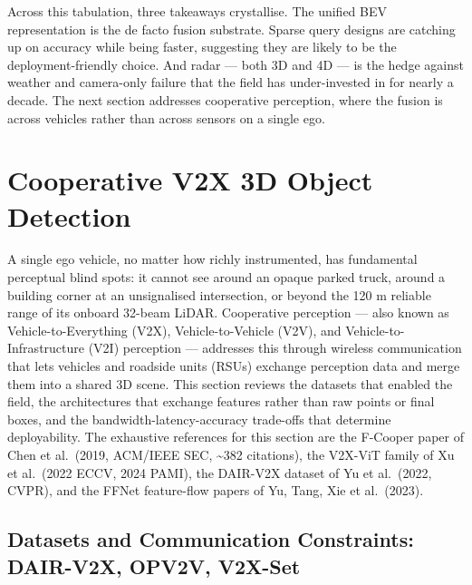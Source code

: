 \documentclass{article}
\begin{document}
Across this tabulation, three takeaways crystallise. The unified BEV representation is the de facto fusion substrate. Sparse query designs are catching up on accuracy while being faster, suggesting they are likely to be the deployment-friendly choice. And radar --- both 3D and 4D --- is the hedge against weather and camera-only failure that the field has under-invested in for nearly a decade. The next section addresses cooperative perception, where the fusion is across vehicles rather than across sensors on a single ego.
\section{Cooperative V2X 3D Object Detection}\label{sec:cooperative-v2x-3d-object-detection}
A single ego vehicle, no matter how richly instrumented, has fundamental perceptual blind spots: it cannot see around an opaque parked truck, around a building corner at an unsignalised intersection, or beyond the 120 m reliable range of its onboard 32-beam LiDAR. Cooperative perception --- also known as Vehicle-to-Everything (V2X), Vehicle-to-Vehicle (V2V), and Vehicle-to-Infrastructure (V2I) perception --- addresses this through wireless communication that lets vehicles and roadside units (RSUs) exchange perception data and merge them into a shared 3D scene. This section reviews the datasets that enabled the field, the architectures that exchange features rather than raw points or final boxes, and the bandwidth-latency-accuracy trade-offs that determine deployability. The exhaustive references for this section are the F-Cooper paper of Chen et al.~(2019, ACM/IEEE SEC, \textasciitilde382 citations), the V2X-ViT family of Xu et al.~(2022 ECCV, 2024 PAMI), the DAIR-V2X dataset of Yu et al.~(2022, CVPR), and the FFNet feature-flow papers of Yu, Tang, Xie et al.~(2023).

\subsection{Datasets and Communication Constraints: DAIR-V2X, OPV2V, V2X-Set}\label{datasets-and-communication-constraints-dair-v2x-opv2v-v2x-set}
\end{document}
